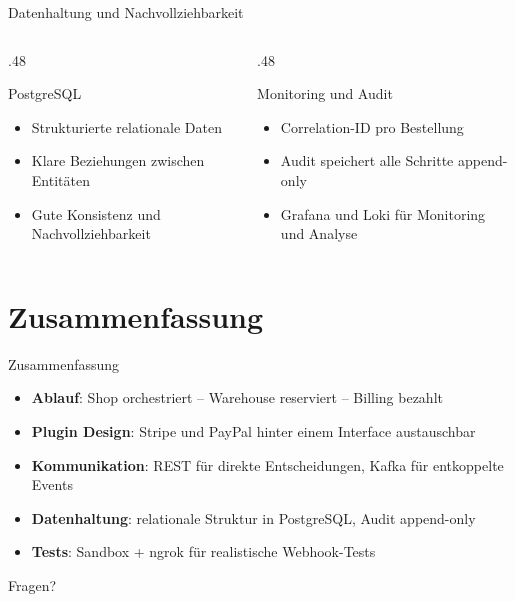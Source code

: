\documentclass[aspectratio=169,11pt]{beamer}
\begin{document}
\begin{frame}{Datenhaltung und Nachvollziehbarkeit}
    \begin{columns}[T]
        \begin{column}{.48\textwidth}
            \begin{block}{PostgreSQL}
                \begin{itemize}
                    \item Strukturierte relationale Daten
                    \item Klare Beziehungen zwischen Entitäten
                    \item Gute Konsistenz und Nachvollziehbarkeit
                \end{itemize}
            \end{block}
        \end{column}
        \begin{column}{.48\textwidth}
            \begin{block}{Monitoring und Audit}
                \begin{itemize}
                    \item Correlation-ID pro Bestellung
                    \item Audit speichert alle Schritte append-only
                    \item Grafana und Loki für Monitoring und Analyse
                \end{itemize}
            \end{block}
        \end{column}
    \end{columns}
\end{frame}


\section{Zusammenfassung}
\begin{frame}{Zusammenfassung}
    \begin{itemize}
        \item \textbf{Ablauf}: Shop orchestriert – Warehouse reserviert – Billing bezahlt
        \item \textbf{Plugin Design}: Stripe und PayPal hinter einem Interface austauschbar
        \item \textbf{Kommunikation}: REST für direkte Entscheidungen, Kafka für entkoppelte Events
        \item \textbf{Datenhaltung}: relationale Struktur in PostgreSQL, Audit append-only
        \item \textbf{Tests}: Sandbox + ngrok für realistische Webhook-Tests
    \end{itemize}
    \vspace{.6cm}
    \centering
    {\Large Fragen?}
\end{frame}
\end{document}
